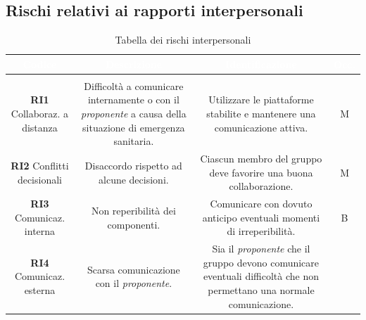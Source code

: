\vspace{-1cm}
\subsection{Rischi relativi ai rapporti interpersonali}
\begin{center}
\begin{longtable}{C{\colA} | C{\colB} | C{\colC} | C{\colD}}
		\textcolor{white}{\textbf{Codice}} & 
		\textcolor{white}{\textbf{Descrizione}} & 
		\textcolor{white}{\textbf{Identificazione}} & 
		\textcolor{white}{\textbf{Occ.}} \\
		\endfirsthead
	    \\
	    \endfoot
	    \caption{Tabella dei rischi interpersonali}
	    \endlastfoot

\textbf{RI1} \newline Collaboraz. a distanza &

Difficoltà a comunicare internamente o con il \textit{proponente} a causa della situazione di emergenza sanitaria. & 

Utilizzare le piattaforme stabilite e mantenere una comunicazione attiva.  & 

M \\
\textbf{RI2} \newline Conflitti decisionali &

Disaccordo rispetto ad alcune decisioni. & 

Ciascun membro del gruppo deve favorire una buona collaborazione.  & 

M \\
\textbf{RI3} \newline Comunicaz. interna &

Non reperibilità dei componenti. & 

Comunicare con dovuto anticipo eventuali momenti di irreperibilità.  & 

B \\

\textbf{RI4} \newline Comunicaz. esterna &

Scarsa comunicazione con il \textit{proponente}. & 

Sia il \textit{proponente} che il gruppo devono comunicare eventuali difficoltà che non permettano una normale comunicazione.  & 


\end{longtable}
\end{center}
